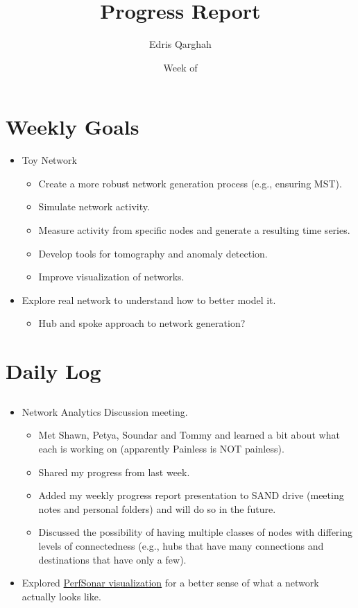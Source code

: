 \documentclass{weeklyreport}
\title{Progress Report}
\author{Edris Qarghah}
\date{Week of \DTMusedate{reportdate}}
\begin{document}
\maketitle

\newpage

\section*{Weekly Goals}


\begin{itemize}
    \item Toy Network
    \begin{itemize}
        \item Create a more robust network generation process (e.g., ensuring MST).
        \item Simulate network activity.
        \item Measure activity from specific nodes and generate a resulting time series.
        \item Develop tools for tomography and anomaly detection.
        \item Improve visualization of networks.
    \end{itemize}
    \item Explore real network to understand how to better model it.
    \begin{itemize}
    	\item Hub and spoke approach to network generation?
    \end{itemize}
\end{itemize}

\section*{Daily Log}

\subsection*{}

\begin{itemize}
    \item Network Analytics Discussion meeting.
    \begin{itemize}
    	\item Met Shawn, Petya, Soundar and Tommy and learned a bit about what each is working on (apparently Painless is NOT painless).
    	\item Shared my progress from last week.
    	\item Added my weekly progress report presentation to SAND drive (meeting notes and personal folders) and will do so in the future.
    	\item Discussed the possibility of having multiple classes of nodes with differing levels of connectedness (e.g., hubs that have many connections and destinations that have only a few).
    \end{itemize}
    \item Explored \href{https://perfsonar.uc.ssl-hep.org/}{PerfSonar visualization} for a better sense of what a network actually looks like.
\end{itemize}
\end{document}
